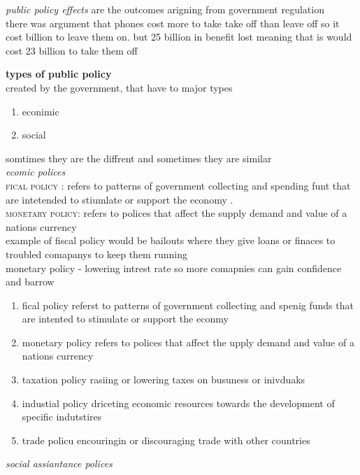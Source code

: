 \documentclass{article}
\newcommand\tab[1][1cm]{\hspace*{#1}}
\begin{document}
\begin{itemize}
\textit{public policy effects} are the outcomes arigning from government regulation \\
there was argument that phones cost more to take take off than leave off 
so it cost  billion to leave them on. but 25 billion in benefit lost meaning that is would cost 23 billion to take them off 

 

\textbf{\huge types of public policy }\\
 created by the government, that have to major types 
 \begin{enumerate}
 \item econimic 
 \item social  
 \end{enumerate}
somtimes they are the diffrent and sometimes they are similar \\

\textit{\huge ecomic polices }\\

\textsc{fical policy} : refers to patterns of government  collecting and spending funt that are intetended to stiumlate or support the economy . \\
\textsc{monetary policy}: refers to polices that affect the supply demand and value of a nations currency \\

example of fiscal policy would be bailouts where they give loans or finaces to troubled comapanys to keep them running \\
monetary policy - lowering intrest rate so more comapnies can gain confidence and barrow 

\begin{enumerate}
\item fical policy referst to patterns of government collecting and spenig funds that are intented to stimulate or support the econmy 
\item monetary policy refers to polices that affect the upply demand and value of a nations currency 
\item taxation policy  rasiing or lowering taxes on busuness or inivduaks 
\item industial policy  driceting economic resources towards the development of specific indutstires 
\item trade policu encouringin or discouraging trade with other countries 
\end{enumerate}


\end{itemize}
\tab[4cm]\textit{\huge social assiantance polices  }
\end{document}
